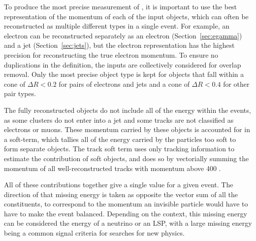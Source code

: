 To produce the most precise measurement of \met, it is important to use the best representation of the momentum of each of the input objects, which can often be reconstructed as multiple different types in a single event.
For example, an electron can be reconstructed separately as an electron (Section~\ref{sec:egamma}) and a jet (Section~\ref{sec:jets}), but the electron representation has the highest precision for reconstructing the true electron momentum.
To ensure no duplications in the \met definition, the inputs are collectively considered for overlap removal.
Only the most precise object type is kept for objects that fall within a cone of $\Delta R < 0.2$ for pairs of electrons and jets and a cone of $\Delta R < 0.4$ for other pair types.

The fully reconstructed objects do not include all of the energy within the events, as some clusters do not enter into a jet and some tracks are not classified as electrons or muons.
These momentum carried by these objects is accounted for in a soft-term, which tallies all of the energy carried by the particles too soft to form separate objects.
The track soft term uses only tracking information to estimate the contribution of soft objects, and does so by vectorially summing the momentum of all well-reconstructed tracks with momentum above 400 \MeV.

All of these contributions together give a single \met value for a given event.
The direction of that missing energy is taken as opposite the vector sum of all the constituents, to correspond to the momentum an invisible particle would have to have to make the event balanced.
Depending on the context, this missing energy can be considered the energy of a neutrino or an \ac{LSP}, with a large missing energy being a common signal criteria for searches for new physics.

